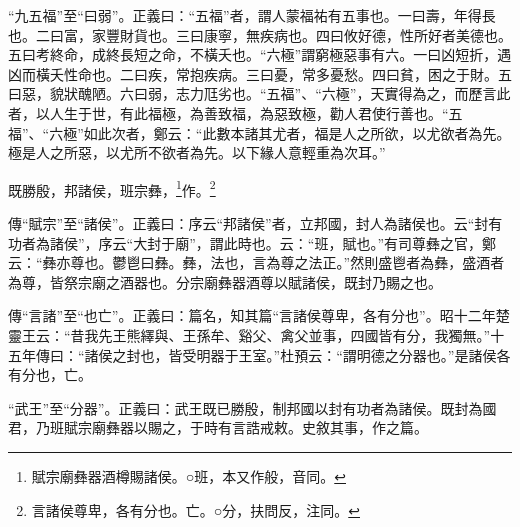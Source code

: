 {\noindent\shu{}\fzkt “九五福”至“曰弱”。正義曰：“五福”者，謂人蒙福祐有五事也。一曰壽，年得長也。二曰富，家豐財貨也。三曰康寧，無疾病也。四曰攸好德，性所好者美德也。五曰考終命，成終長短之命，不橫夭也。“六極”謂窮極惡事有六。一曰凶短折，遇凶而橫夭性命也。二曰疾，常抱疾病。三曰憂，常多憂愁。四曰貧，困之于財。五曰惡，貌狀醜陋。六曰弱，志力尫劣也。“五福”、“六極”，天實得為之，而歷言此者，以人生于世，有此福極，為善致福，為惡致極，勸人君使行善也。“五福”、“六極”如此次者，鄭云：“此數本諸其尤者，福是人之所欲，以尤欲者為先。極是人之所惡，以尤所不欲者為先。以下緣人意輕重為次耳。” \par}

既勝殷，邦諸侯，班宗彝，\footnote{賦宗廟彝器酒樽賜諸侯。○班，本又作般，音同。}作。\footnote{言諸侯尊卑，各有分也。亡。○分，扶問反，注同。}

{\noindent\zhuan{}\fzbyks 傳“賦宗”至“諸侯”。正義曰：序云“邦諸侯”者，立邦國，封人為諸侯也。云“封有功者為諸侯”，序云“大封于廟”，謂此時也。云：“班，賦也。”有司尊彝之官，鄭云：“彝亦尊也。鬱鬯曰彝。彝，法也，言為尊之法正。”然則盛鬯者為彝，盛酒者為尊，皆祭宗廟之酒器也。分宗廟彝器酒尊以賦諸侯，既封乃賜之也。 \par}

{\noindent\zhuan{}\fzbyks 傳“言諸”至“也亡”。正義曰：篇名，知其篇“言諸侯尊卑，各有分也”。昭十二年楚靈王云：“昔我先王熊繹與、王孫牟、谿父、禽父並事，四國皆有分，我獨無。”十五年傳曰：“諸侯之封也，皆受明器于王室。”杜預云：“謂明德之分器也。”是諸侯各有分也，亡。 \par}

{\noindent\shu{}\fzkt “武王”至“分器”。正義曰：武王既已勝殷，制邦國以封有功者為諸侯。既封為國君，乃班賦宗廟彝器以賜之，于時有言誥戒敕。史敘其事，作之篇。 \par}

